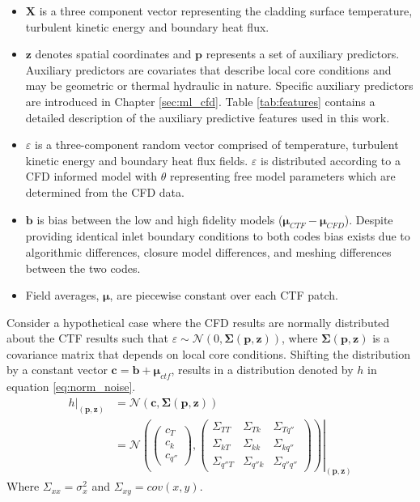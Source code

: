 \begin{itemize}
        \item $\mathbf X$ is a three component vector representing the cladding surface temperature, turbulent kinetic energy and boundary heat flux.
        \item $\mathbf z$ denotes spatial coordinates and $\mathbf p$ represents a set of auxiliary predictors.  Auxiliary predictors are covariates that describe local core conditions and may be geometric or thermal hydraulic in nature.   Specific auxiliary predictors are introduced in Chapter \ref{sec:ml_cfd}.  Table \ref{tab:features} contains a detailed description of the auxiliary predictive features used in this work.
        \item  $\varepsilon$ is a three-component random vector comprised of temperature, turbulent kinetic energy and boundary heat flux fields.  $\varepsilon$ is distributed according to a CFD informed model with $\theta$ representing free model parameters which are determined from the CFD data.
        \item $\bm b$ is bias between the low and high fidelity models ($\bm \mu_{CTF} - \bm \mu_{CFD}$).  Despite providing identical inlet boundary conditions to both codes bias exists due to algorithmic differences, closure model differences, and meshing differences between the two codes.
        \item Field averages, $\bm \mu$, are piecewise constant over each CTF patch.
\end{itemize}

Consider a hypothetical case where the CFD results are normally distributed about the CTF results such that $\varepsilon \sim \mathcal N(0, \bm \Sigma(\mathbf p, \mathbf z))$, where $ \bm \Sigma(\mathbf p, \mathbf z)$ is a covariance matrix that depends on local core conditions.  Shifting the distribution by a constant vector $\bm c=\bm b + \bm \mu_{ctf}$, results in a distribution denoted by $h$ in equation \ref{eq:norm_noise}.
\begin{align}
    \left. h \right|_{(\bm p, \bm z)} & = \mathcal N(\bm c, \bm \Sigma(\mathbf p, \bm z)) \nonumber \\
    & = \left.
        \mathcal N \left(
        \begin{pmatrix}
            c_T \\
            c_k \\
            c_{q''}
        \end{pmatrix}
    ,
        \begin{pmatrix}
            \Sigma_{TT} & \Sigma_{Tk} & \Sigma_{Tq''} \\
            \Sigma_{kT} & \Sigma_{kk} & \Sigma_{kq''} \\
            \Sigma_{q''T} & \Sigma_{q''k} & \Sigma_{q''q''}
        \end{pmatrix}
    \right)
    \right|_{(\mathbf p, \mathbf z)}
\label{eq:norm_noise}
\end{align}
Where $\Sigma_{xx} = \sigma_x^2$ and $\Sigma_{xy} = cov(x,y)$.

